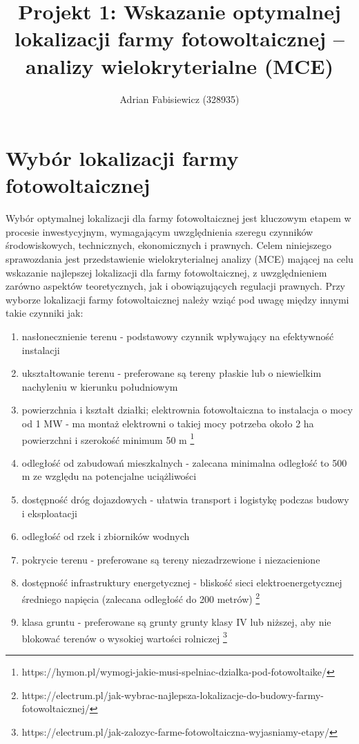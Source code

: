 \documentclass{article}
\title{Projekt 1: Wskazanie optymalnej lokalizacji farmy fotowoltaicznej – analizy wielokryterialne (MCE)}
\author{Adrian Fabisiewicz (328935)}
\begin{document}
\maketitle
\tableofcontents  %
\renewcommand{\labelenumii}{\arabic{enumi}.\arabic{enumii}}
\renewcommand{\labelenumiii}{\arabic{enumi}.\arabic{enumii}.\arabic{enumiii}}
\renewcommand{\labelenumiv}{\arabic{enumi}.\arabic{enumii}.\arabic{enumiii}.\arabic{enumiv}}

\newpage
\section{Wybór lokalizacji farmy fotowoltaicznej}

Wybór optymalnej lokalizacji dla farmy fotowoltaicznej jest kluczowym etapem w procesie inwestycyjnym, wymagającym uwzględnienia szeregu czynników środowiskowych, technicznych, ekonomicznych i prawnych. Celem niniejszego sprawozdania jest przedstawienie wielokryterialnej analizy (MCE) mającej na celu wskazanie najlepszej lokalizacji dla farmy fotowoltaicznej, z uwzględnieniem zarówno aspektów teoretycznych, jak i obowiązujących regulacji prawnych. \newline
Przy wyborze lokalizacji farmy fotowoltaicznej należy wziąć pod uwagę między innymi takie czynniki jak:

\begin{enumerate}[label=•]
    \item nasłonecznienie terenu - podstawowy czynnik wpływający na efektywność instalacji 
    \item ukształtowanie terenu - preferowane są tereny płaskie lub o niewielkim nachyleniu w kierunku południowym
    \item powierzchnia i kształt działki; elektrownia fotowoltaiczna to instalacja o mocy od 1 MW - ma montaż elektrowni o takiej mocy potrzeba około 2 ha powierzchni i szerokość minimum 50 m  \footnote{https://hymon.pl/wymogi-jakie-musi-spelniac-dzialka-pod-fotowoltaike/}
    \item odległość od zabudowań mieszkalnych - zalecana minimalna odległość to 500 m ze względu na potencjalne uciążliwości
    \item dostępność dróg dojazdowych - ułatwia transport i logistykę podczas budowy i eksploatacji
    \item odległość od rzek i zbiorników wodnych
    \item pokrycie terenu - preferowane są tereny niezadrzewione i niezacienione
    \item dostępność infrastruktury energetycznej - bliskość sieci elektroenergetycznej średniego napięcia (zalecana odległość do 200 metrów)
    \footnote{https://electrum.pl/jak-wybrac-najlepsza-lokalizacje-do-budowy-farmy-fotowoltaicznej/}
    \item klasa gruntu - preferowane są grunty grunty klasy IV lub niższej, aby nie blokować terenów o wysokiej wartości rolniczej \footnote{https://electrum.pl/jak-zalozyc-farme-fotowoltaiczna-wyjasniamy-etapy/}
\end{enumerate}
\vspace{10pt}
\end{document}
